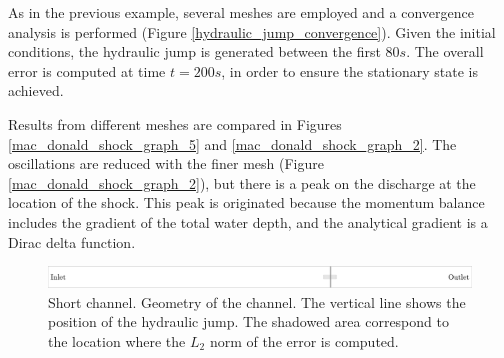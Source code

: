 \documentclass[a4paper,12pt]{article}
\begin{document}
As in the previous example, several meshes are employed and a convergence analysis is performed (Figure \ref{hydraulic_jump_convergence}). Given the initial conditions, the hydraulic jump is generated between the first $80s$. The overall error is computed at time $t=200s$, in order to ensure the stationary state is achieved.

Results from different meshes are compared in Figures \ref{mac_donald_shock_graph_5} and \ref{mac_donald_shock_graph_2}. The oscillations are reduced with the finer mesh (Figure \ref{mac_donald_shock_graph_2}), but there is a peak on the discharge at the location of the shock. This peak is originated because the momentum balance includes the gradient of the total water depth, and the analytical gradient is a Dirac delta function.

\begin{figure}
    \includegraphics[width=\textwidth]{img/jump/sketch/sketch.pdf}
    \caption{Short channel. Geometry of the channel. The vertical line shows the position of the hydraulic jump. The shadowed area correspond to the location where the $L_2$ norm of the error is computed.}
    \label{chanel_geometry}
\end{figure}
\end{document}
